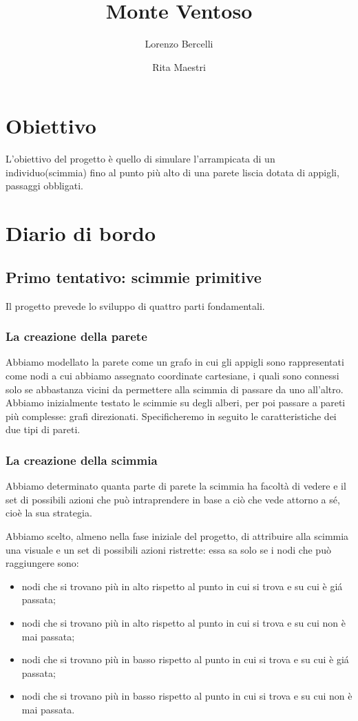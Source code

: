 \documentclass{article}
\begin{document}
	
	\title{Monte Ventoso}
	\author{Lorenzo Bercelli \and Rita Maestri}
	\maketitle
	
	\section{Obiettivo}
	L'obiettivo del progetto \`{e} quello di simulare l'arrampicata di un individuo(scimmia) fino al punto pi\`{u} alto di una parete liscia dotata di appigli, passaggi obbligati.
	\section{Diario di bordo}
	\subsection{Primo tentativo: scimmie primitive}
	Il progetto prevede lo sviluppo di quattro parti fondamentali.
        \subsubsection{La creazione della parete} Abbiamo modellato la parete come un grafo in cui gli appigli sono rappresentati come nodi a cui abbiamo assegnato coordinate cartesiane, i quali sono connessi solo se abbastanza vicini da permettere alla scimmia di passare da uno all'altro. Abbiamo inizialmente testato le scimmie su degli alberi, per poi passare a pareti pi\`{u} complesse: grafi direzionati. Specificheremo in seguito le caratteristiche dei due tipi di pareti.
	
        \subsubsection{La creazione della scimmia} Abbiamo determinato quanta parte di parete la scimmia ha facolt\`{a} di vedere e il set di possibili azioni che pu\`{o} intraprendere in base a ci\`{o} che vede attorno a s\'{e}, cio\`{e} la sua strategia.

	Abbiamo scelto, almeno nella fase iniziale del progetto, di attribuire alla scimmia una visuale e un set di possibili azioni ristrette: essa sa solo se i nodi che pu\`{o} raggiungere sono:
	\begin{itemize}
		\item nodi che si trovano pi\`{u} in alto rispetto al punto in cui si trova e su cui \`{e} gi\'{a} passata;
		\item nodi che si trovano pi\`{u} in alto rispetto al punto in cui si trova e su cui non \`{e} mai passata;
		\item nodi che si trovano pi\`{u} in basso rispetto al punto in cui si trova e su cui \`{e} gi\'{a} passata;
		\item nodi che si trovano pi\`{u} in basso rispetto al punto in cui si trova e su cui non \`{e} mai passata.
	\end{itemize}
\end{document}
